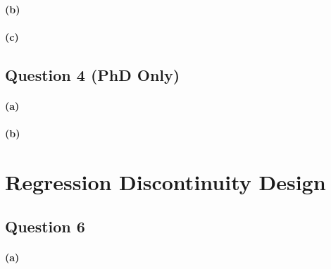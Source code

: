 \documentclass{scrartcl}
\begin{document}
\paragraph*{(b)}

\paragraph*{(c)}

\subsection*{Question 4 (PhD Only)}

\paragraph*{(a)}

\paragraph*{(b)}

\section*{Regression Discontinuity Design}

\subsection*{Question 6}

\paragraph*{(a)}
\end{document}
